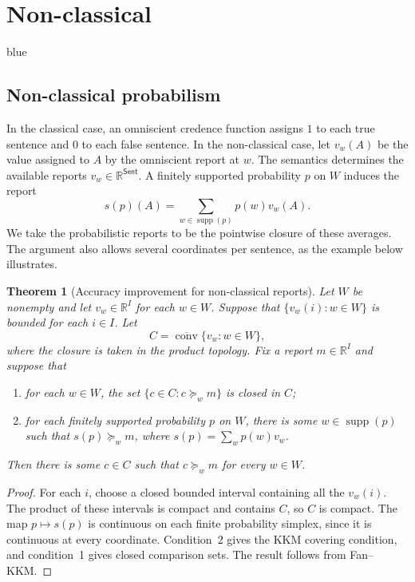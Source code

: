 \documentclass[11pt]{article}
\newtheorem{theorem}{Theorem}[section]
\theoremstyle{definition}
\theoremstyle{remark}
\newenvironment{AIwritten}{\begin{color}{blue}}{\end{color}}
\begin{document}
\section{Non-classical}
\begin{AIwritten}
	\subsection{Non-classical probabilism}
	
	In the classical case, an omniscient credence function assigns
	$1$ to each true sentence and $0$ to each false sentence. In the
	non-classical case, let $v_w(A)$ be the value assigned to $A$
	by the omniscient report at $w$. The semantics determines the
	available reports $v_w\in\mathbb R^{\mathsf{Sent}}$. A finitely
	supported probability $p$ on $W$ induces the report
	\[
	s(p)(A)=\sum_{w\in\operatorname{supp}(p)} p(w)v_w(A).
	\]
	We take the probabilistic reports to be the pointwise closure
	of these averages. The argument also allows several coordinates
	per sentence, as the example below illustrates.
	
	\begin{theorem}[Accuracy improvement for non-classical reports]
		Let $W$ be nonempty and let $v_w\in\mathbb R^I$ for each $w\in W$.
		Suppose that $\{v_w(i):w\in W\}$ is bounded for each $i\in I$.
		Let
		\[
		C=\overline{\operatorname{conv}}\{v_w:w\in W\},
		\]
		where the closure is taken in the product topology. Fix a
		report $m\in\mathbb R^I$ and suppose that
		\begin{enumerate}
			\item for each $w\in W$, the set
			$\{c\in C:c\succeq_w m\}$ is closed in $C$;
			\item for each finitely supported probability $p$ on $W$,
			there is some $w\in\operatorname{supp}(p)$ such that
			$s(p)\succeq_w m$, where $s(p)=\sum_w p(w)v_w$.
		\end{enumerate}
		Then there is some $c\in C$ such that $c\succeq_w m$
		for every $w\in W$.
	\end{theorem}
	
	\begin{proof}
		For each $i$, choose a closed bounded interval containing all
		the $v_w(i)$. The product of these intervals is compact and
		contains $C$, so $C$ is compact. The map $p\mapsto s(p)$ is
		continuous on each finite probability simplex, since it is
		continuous at every coordinate. Condition~2 gives the KKM
		covering condition, and condition~1 gives closed comparison
		sets. The result follows from Fan--KKM.
	\end{proof}
	

\end{AIwritten}
\end{document}
